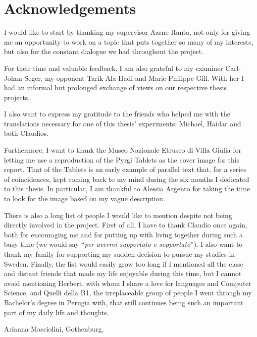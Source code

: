 \thispagestyle{plain}
\section*{Acknowledgements}
I would like to start by thanking my supervisor Aarne Ranta, not only for giving me an opportunity to work on a topic that puts together so many of my interests, but also for the constant dialogue we had throughout the project. \smallskip

For their time and valuable feedback, I am also grateful to my examiner Carl-Johan Seger, my opponent Tarik Ala Hadi and Marie-Philippe Gill. With her I had an informal but prolonged exchange of views on our respective thesis projects. \smallskip

I also want to express my gratitude to the friends who helped me with the translations necessary for one of this thesis' experiments: Michael, Haidar and both Claudios. \smallskip

Furthermore, I want to thank the Museo Nazionale Etrusco di Villa Giulia for letting me use a reproduction of the Pyrgi Tablets as the cover image for this report. That of the Tablets is an early example of parallel text that, for a series of coincidences, kept coming back to my mind during the six months I dedicated to this thesis. In particular, I am thankful to Alessia Argento for taking the time to look for the image based on my vague description. \smallskip

There is also a long list of people I would like to mention despite not being directly involved in the project. 
First of all, I have to thank Claudio once again, both for encouraging me and for putting up with living together during such a busy time (we would say ``\textit{per avermi supportato e sopportato}'').
I also want to thank my family for supporting my sudden decision to pursue my studies in Sweden.
Finally, the list would easily grow too long if I mentioned all the close and distant friends that made my life enjoyable during this time, but I cannot avoid mentioning Herbert, with whom I share a love for languages and Computer Science, and Quelli della B1, the irreplaceable group of people I went through my Bachelor's degree in Perugia with, that still continues being such an important part of my daily life and thoughts.

\vspace{1.5cm}
\hfill
Arianna Masciolini, Gothenburg, \monthname \space \the\year

\newpage				%
\thispagestyle{empty}
\mbox{}